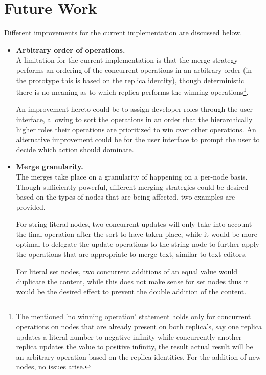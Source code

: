 \section{Future Work}\label{sec:future-work}

Different improvements for the current implementation are discussed below.

\begin{itemize}
    \item \textbf{Arbitrary order of operations.}\\
    A limitation for the current implementation is that the merge strategy performs an ordering of the concurrent
    operations in an arbitrary order (in the prototype this is based on the replica identity), though deterministic
    there is no meaning as to which replica performs the winning operations\footnote{
        The mentioned 'no winning operation' statement holds only for concurrent operations on nodes that are already
        present on both replica's, say one replica updates a literal number to negative infinity while concurrently
        another replica updates the value to positive infinity, the result actual result will be an arbitrary operation
        based on the replica identities.
        For the addition of new nodes, no issues arise.
    }.

    An improvement hereto could be to assign developer roles through the user interface, allowing to sort the operations
    in an order that the hierarchically higher roles their operations are prioritized to win over other operations.
    An alternative improvement could be for the user interface to prompt the user to decide which action should
    dominate.

    \item \textbf{Merge granularity.}\\
    The merges take place on a granularity of happening on a per-node basis.
    Though sufficiently powerful, different merging strategies could be desired based on the types of nodes that are
    being affected, two examples are provided.

    For string literal nodes, two concurrent updates will only take into account the final operation after the sort to
    have taken place, while it would be more optimal to delegate the update operations to the string node to further
    apply the operations that are appropriate to merge text, similar to text editors.

    For literal set nodes, two concurrent additions of an equal value would duplicate the content, while this does not
    make sense for set nodes thus it would be the desired effect to prevent the double addition of the content.
\end{itemize}

